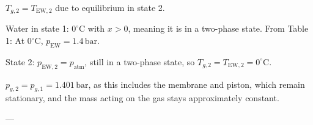 \( T_{g,2} = T_{\text{EW},2} \) due to equilibrium in state 2.  

Water in state 1: \( 0^\circ \text{C} \) with \( x > 0 \), meaning it is in a two-phase state.  
From Table 1: At \( 0^\circ \text{C} \), \( p_{\text{EW}} = 1.4 \, \text{bar} \).  

State 2: \( p_{\text{EW},2} = p_{\text{atm}} \), still in a two-phase state, so  
\( T_{g,2} = T_{\text{EW},2} = 0^\circ \text{C} \).  

\( p_{g,2} = p_{g,1} = 1.401 \, \text{bar} \), as this includes the membrane and piston, which remain stationary, and the mass acting on the gas stays approximately constant.  

---